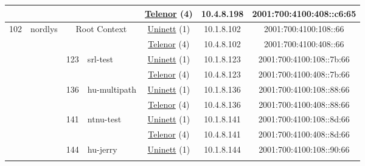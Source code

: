 \begin{small}
\begin{center}
\begin{longtable}{|c|c|c|c|c|c|c|c|}
  &  &  &  & \multicolumn{2}{|c|}{\tiny{\href{https://www.telenor.no}{Telenor} (4)}} & \tiny{10.4.8.198} & \tiny{2001:700:4100:408::c6:65} \\ \hline
 \multirow{32}{*}{\tiny{102}} & \multicolumn{1}{|l|}{\multirow{32}{*}{\tiny{nordlys}}} & \multicolumn{2}{|c|}{\multirow{2}{*}{\tiny{Root Context}}} & \multicolumn{2}{|c|}{\tiny{\href{https://www.uninett.no}{Uninett} (1)}} & \tiny{10.1.8.102} & \tiny{2001:700:4100:108::66} \\* \cline{5-5}\cline{6-6}\cline{7-7}\cline{8-8}
  &  & \multicolumn{2}{|c|}{} & \multicolumn{2}{|c|}{\tiny{\href{https://www.telenor.no}{Telenor} (4)}} & \tiny{10.4.8.102} & \tiny{2001:700:4100:408::66} \\* \cline{3-3}\cline{4-4}\cline{5-5}\cline{6-6}\cline{7-7}\cline{8-8}
  &  & \multirow{2}{*}{\tiny{123}} & \multicolumn{1}{|l|}{\multirow{2}{*}{\tiny{srl-test}}} & \multicolumn{2}{|c|}{\tiny{\href{https://www.uninett.no}{Uninett} (1)}} & \tiny{10.1.8.123} & \tiny{2001:700:4100:108::7b:66} \\* \cline{5-5}\cline{6-6}\cline{7-7}\cline{8-8}
  &  &  &  & \multicolumn{2}{|c|}{\tiny{\href{https://www.telenor.no}{Telenor} (4)}} & \tiny{10.4.8.123} & \tiny{2001:700:4100:408::7b:66} \\* \cline{3-3}\cline{4-4}\cline{5-5}\cline{6-6}\cline{7-7}\cline{8-8}
  &  & \multirow{2}{*}{\tiny{136}} & \multicolumn{1}{|l|}{\multirow{2}{*}{\tiny{hu-multipath}}} & \multicolumn{2}{|c|}{\tiny{\href{https://www.uninett.no}{Uninett} (1)}} & \tiny{10.1.8.136} & \tiny{2001:700:4100:108::88:66} \\* \cline{5-5}\cline{6-6}\cline{7-7}\cline{8-8}
  &  &  &  & \multicolumn{2}{|c|}{\tiny{\href{https://www.telenor.no}{Telenor} (4)}} & \tiny{10.4.8.136} & \tiny{2001:700:4100:408::88:66} \\* \cline{3-3}\cline{4-4}\cline{5-5}\cline{6-6}\cline{7-7}\cline{8-8}
  &  & \multirow{2}{*}{\tiny{141}} & \multicolumn{1}{|l|}{\multirow{2}{*}{\tiny{ntnu-test}}} & \multicolumn{2}{|c|}{\tiny{\href{https://www.uninett.no}{Uninett} (1)}} & \tiny{10.1.8.141} & \tiny{2001:700:4100:108::8d:66} \\* \cline{5-5}\cline{6-6}\cline{7-7}\cline{8-8}
  &  &  &  & \multicolumn{2}{|c|}{\tiny{\href{https://www.telenor.no}{Telenor} (4)}} & \tiny{10.4.8.141} & \tiny{2001:700:4100:408::8d:66} \\* \cline{3-3}\cline{4-4}\cline{5-5}\cline{6-6}\cline{7-7}\cline{8-8}
  &  & \multirow{2}{*}{\tiny{144}} & \multicolumn{1}{|l|}{\multirow{2}{*}{\tiny{hu-jerry}}} & \multicolumn{2}{|c|}{\tiny{\href{https://www.uninett.no}{Uninett} (1)}} & \tiny{10.1.8.144} & \tiny{2001:700:4100:108::90:66} \\* \cline{5-5}\cline{6-6}\cline{7-7}\cline{8-8}

\end{longtable}
\end{center}
\end{small}
